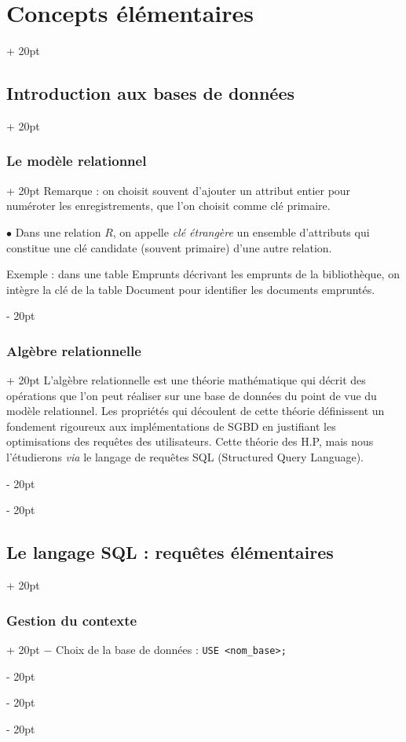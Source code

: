 \documentclass[a4paper, 12pt, twoside]{article}
\newcommand{\ind}[1][20pt]{\advance\leftskip + #1}
\newcommand{\deind}[1][20pt]{\advance\leftskip - #1}
\newenvironment{indt}[2][20pt]{#2 \par \ind[#1]}{\par \deind} %
\begin{document}
\begin{indt}{\section{Concepts élémentaires}}
\begin{indt}{\subsection{Introduction aux bases de données}}
\begin{indt}{\subsubsection{Le modèle relationnel}}
                Remarque : on choisit souvent d'ajouter un attribut entier pour numéroter les enregistrements, que l'on choisit comme clé primaire.
                
                \vspace{12pt}
                
                $\bullet$ Dans une relation $R$, on appelle \textit{clé étrangère} un ensemble d'attributs qui constitue une clé candidate (souvent primaire) d'une autre relation.
                
                \vspace{6pt}
                
                Exemple : dans une table Emprunts décrivant les emprunts de la bibliothèque, on intègre la clé de la table Document pour identifier les documents empruntés.
            \end{indt}
            
            \vspace{12pt}
            
            \begin{indt}{\subsubsection{Algèbre relationnelle}}
                L'algèbre relationnelle est une théorie mathématique qui décrit des opérations que l'on peut réaliser sur une base de données du point de vue du modèle relationnel. Les propriétés qui découlent de cette théorie définissent un fondement rigoureux aux implémentations de SGBD en justifiant les optimisations des requêtes des utilisateurs. Cette théorie des H.P, mais nous l'étudierons \textit{via} le langage de requêtes SQL (Structured Query Language).
            \end{indt}
        \end{indt}
        
        \begin{indt}{\subsection{Le langage SQL : requêtes élémentaires}}
            \begin{indt}{\subsubsection{Gestion du contexte}}
                $-$ Choix de la base de données : \texttt{USE <nom\_base>;}
                

\end{indt}
\end{indt}
\end{indt}
\end{document}
